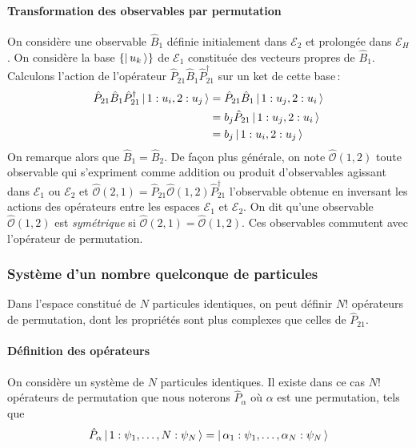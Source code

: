             \paragraph{Transformation des observables par permutation}

            On considère une observable $\hat{B}_1$ définie initialement dans $\mathcal{E}_2$ et prolongée dans $\mathcal{E}_{H}$. On considère la base $\left\{\left| \, u_k \, \right>\right\}$ de $\mathcal{E}_1$ constituée des vecteurs propres de $\hat{B}_1$. Calculons l’action de l’opérateur $\hat{P}_{21} \hat{B}_1 \hat{P}_{21}^{\dagger}$ sur un ket de cette base :
            \begin{align*}
                \hat{P}_{21} \hat{B}_1 \hat{P}_{21}^{\dagger} \left| \, 1 : u_i, 2 : u_j \, \right> 
                &= \hat{P}_{21} \hat{B}_1 \left| \, 1 : u_j, 2 : u_i \, \right> \\
                &= b_j \hat{P}_{21} \left| \, 1 : u_j, 2 : u_i \, \right> \\
                &= b_j \left| \, 1 : u_i, 2 : u_j \, \right> \\
            \end{align*}
            On remarque alors que $\hat{B}_1 = \hat{B}_2$. De façon plus générale, on note $\hat{\mathcal{O}}(1,2)$ toute observable qui s’expriment comme addition ou produit d’observables agissant dans $\mathcal{E}_1$ ou $\mathcal{E}_2$ et $\hat{\mathcal{O}}(2,1) = \hat{P}_{21} \hat{\mathcal{O}}(1,2) \hat{P}_{21}^{\dagger}$ l’observable obtenue en inversant les actions des opérateurs entre les espaces $\mathcal{E}_1$ et $\mathcal{E}_2$. On dit qu’une observable $\hat{\mathcal{O}}(1,2)$ est \textit{symétrique} si $\hat{\mathcal{O}}(2,1) = \hat{\mathcal{O}}(1,2)$. Ces observables commutent avec l’opérateur de permutation.

        \subsubsection{Système d’un nombre quelconque de particules}

            Dans l’espace constitué de $N$ particules identiques, on peut définir $N!$ opérateurs de permutation, dont les propriétés sont plus complexes que celles de $\hat{P}_{21}$. 

            \paragraph{Définition des opérateurs}

            On considère un système de $N$ particules identiques. Il existe dans ce cas $N!$ opérateurs de permutation que nous noterons $\hat{P}_{\alpha}$ où $\alpha$ est une permutation, tels que
            \[ \hat{P}_{\alpha}\left| \, 1 : \psi_1, \ldots, N : \psi_N \, \right> = \left| \, \alpha_1 : \psi_1, \ldots, \alpha_N : \psi_N \, \right> \]

